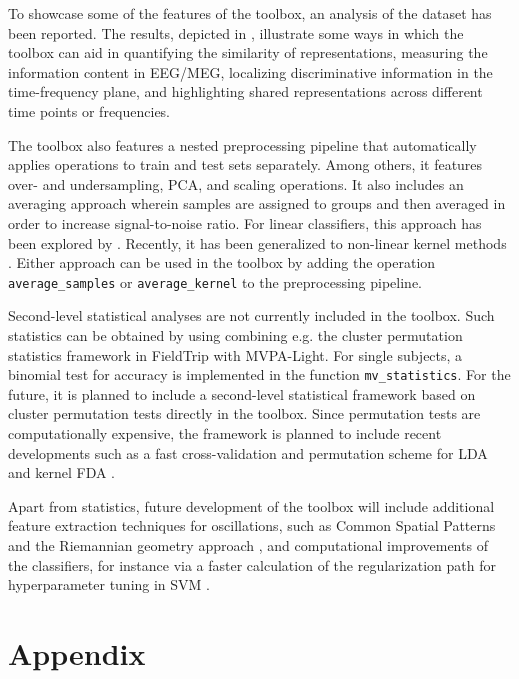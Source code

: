 \documentclass[utf8]{frontiersSCNS} %
\newcommand{\ttt}[1]{\texttt{#1}}
\begin{document}
To showcase some of the features of the toolbox, an analysis of the \cite{Wakeman2015ADataset} dataset has been reported. The results, depicted in , illustrate some ways in which the toolbox can aid in quantifying the similarity of representations, measuring the information content in EEG/MEG, localizing discriminative information in the time-frequency plane, and highlighting shared representations across different time points or frequencies.

The toolbox also features a nested preprocessing pipeline that automatically applies operations to train and test sets separately. Among others, it features over- and undersampling, PCA, and scaling operations. It also includes an averaging approach wherein samples are assigned to groups and then averaged in order to increase signal-to-noise ratio. For linear classifiers, this approach has been explored by \citep{Cichy2015,Cichy2017MultivariateSpace}. Recently, it has been generalized to non-linear kernel methods \citep{Treder2018}. Either approach can be used in the toolbox by adding the operation \ttt{average\_samples} or \ttt{average\_kernel} to the preprocessing pipeline. 

Second-level statistical analyses are not currently included in the toolbox. Such statistics can be obtained by using combining e.g. the cluster permutation statistics framework in FieldTrip \citep{Maris2007} with MVPA-Light. For single subjects, a binomial test for accuracy is implemented in the function \ttt{mv\_statistics}. For the future, it is planned to include a second-level statistical framework based on cluster permutation tests directly in the toolbox. Since permutation tests are computationally expensive, the framework is planned to include recent developments such as a fast cross-validation and permutation scheme for LDA and kernel FDA \citep{Treder2019DirectFDA}.

Apart from statistics, future development of the toolbox will include additional feature extraction techniques for oscillations, such as Common Spatial Patterns \citep{Blankertz2008a} and the Riemannian geometry approach \citep{Barachant2013}, and computational improvements of the classifiers, for instance via a faster calculation of the regularization path for hyperparameter tuning in SVM \citep{Hastie2004TheMachine}.



\section{Appendix}
\end{document}
